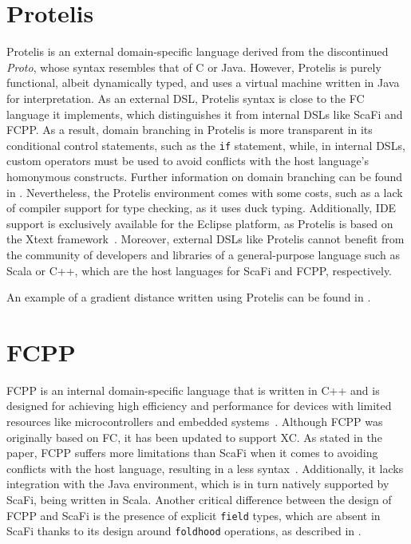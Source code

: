 \section{Protelis} \label{chap:state-of-the-art->sec:protelis}

Protelis is an external domain-specific language derived from the discontinued \textit{Proto}, whose syntax resembles that of C or Java.
%
However, Protelis is purely functional, albeit dynamically typed, and uses a virtual machine written in Java~\cite{protelis} for interpretation.
%
As an external \ac{DSL}, Protelis syntax is close to the \ac{FC} language it implements, which distinguishes it from internal \acp{DSL} like ScaFi and FCPP.
%
As a result, domain branching in Protelis is more transparent in its conditional control statements, such as the \texttt{if} statement, while, in internal DSLs, custom operators must be used to avoid conflicts with the host language's homonymous constructs. 
%
Further information on domain branching can be found in .
%
Nevertheless, the Protelis environment comes with some costs, such as a lack of compiler support for type checking, as it uses duck typing.
%
Additionally, IDE support is exclusively available for the Eclipse platform, as Protelis is based on the Xtext framework~\cite{xtext}.
%
Moreover, external \acp{DSL} like Protelis cannot benefit from the community of developers and libraries of a general-purpose language such as Scala or C++, which are the host languages for ScaFi and FCPP, respectively.

An example of a gradient distance written using Protelis can be found in .




\section{FCPP} \label{chap:state-of-the-art->sec:fcpp}

FCPP is an internal domain-specific language that is written in C++ and is designed for achieving high efficiency and performance for devices with limited resources like microcontrollers and embedded systems~\cite{fcpp}.
%
Although FCPP was originally based on \ac{FC}, it has been updated to support \ac{XC}.
%
As stated in the paper, FCPP suffers more limitations than ScaFi when it comes to avoiding conflicts with the host language, resulting in a less  syntax~\cite{fcpp}.
%
Additionally, it lacks integration with the Java environment, which is in turn natively supported by ScaFi, being written in Scala.
%
Another critical difference between the design of FCPP and ScaFi is the presence of explicit \texttt{field} types, which are absent in ScaFi thanks to its design around \texttt{foldhood} operations, as described in .

